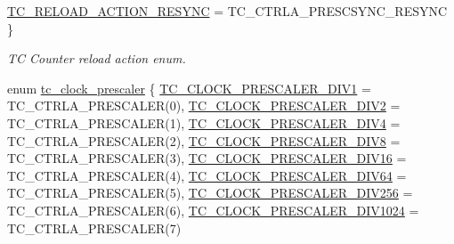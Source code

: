 \begin{DoxyCompactItemize}
\mbox{\hyperlink{group__asfdoc__sam0__tc__group_gga204bb4814c91e62e56d9297c05280aadac78b7c50f80b33d5ef15a63348279f17}{T\+C\+\_\+\+R\+E\+L\+O\+A\+D\+\_\+\+A\+C\+T\+I\+O\+N\+\_\+\+R\+E\+S\+Y\+NC}} = T\+C\+\_\+\+C\+T\+R\+L\+A\+\_\+\+P\+R\+E\+S\+C\+S\+Y\+N\+C\+\_\+\+R\+E\+S\+Y\+NC
 \}
\begin{DoxyCompactList}\small\item\em TC Counter reload action enum. \end{DoxyCompactList}\item 
enum \mbox{\hyperlink{group__asfdoc__sam0__tc__group_ga98aed17b995157e67b9322a45f0ed5f4}{tc\+\_\+clock\+\_\+prescaler}} \{ \newline
\mbox{\hyperlink{group__asfdoc__sam0__tc__group_gga98aed17b995157e67b9322a45f0ed5f4abee76ee986e815120c67ff104dd77275}{T\+C\+\_\+\+C\+L\+O\+C\+K\+\_\+\+P\+R\+E\+S\+C\+A\+L\+E\+R\+\_\+\+D\+I\+V1}} = T\+C\+\_\+\+C\+T\+R\+L\+A\+\_\+\+P\+R\+E\+S\+C\+A\+L\+ER(0), 
\mbox{\hyperlink{group__asfdoc__sam0__tc__group_gga98aed17b995157e67b9322a45f0ed5f4a6326eb4305153ea58ea18ee6a74bc8f0}{T\+C\+\_\+\+C\+L\+O\+C\+K\+\_\+\+P\+R\+E\+S\+C\+A\+L\+E\+R\+\_\+\+D\+I\+V2}} = T\+C\+\_\+\+C\+T\+R\+L\+A\+\_\+\+P\+R\+E\+S\+C\+A\+L\+ER(1), 
\mbox{\hyperlink{group__asfdoc__sam0__tc__group_gga98aed17b995157e67b9322a45f0ed5f4a8c137a94b34809e544d50680c808da23}{T\+C\+\_\+\+C\+L\+O\+C\+K\+\_\+\+P\+R\+E\+S\+C\+A\+L\+E\+R\+\_\+\+D\+I\+V4}} = T\+C\+\_\+\+C\+T\+R\+L\+A\+\_\+\+P\+R\+E\+S\+C\+A\+L\+ER(2), 
\mbox{\hyperlink{group__asfdoc__sam0__tc__group_gga98aed17b995157e67b9322a45f0ed5f4a3dbb4f263ba1e940954ffe8a667bf7d1}{T\+C\+\_\+\+C\+L\+O\+C\+K\+\_\+\+P\+R\+E\+S\+C\+A\+L\+E\+R\+\_\+\+D\+I\+V8}} = T\+C\+\_\+\+C\+T\+R\+L\+A\+\_\+\+P\+R\+E\+S\+C\+A\+L\+ER(3), 
\newline
\mbox{\hyperlink{group__asfdoc__sam0__tc__group_gga98aed17b995157e67b9322a45f0ed5f4aa0bec32bcf9a450d950f9ec9941a6c3a}{T\+C\+\_\+\+C\+L\+O\+C\+K\+\_\+\+P\+R\+E\+S\+C\+A\+L\+E\+R\+\_\+\+D\+I\+V16}} = T\+C\+\_\+\+C\+T\+R\+L\+A\+\_\+\+P\+R\+E\+S\+C\+A\+L\+ER(4), 
\mbox{\hyperlink{group__asfdoc__sam0__tc__group_gga98aed17b995157e67b9322a45f0ed5f4aea8fd1d9e795ec153e80cddc15ad501b}{T\+C\+\_\+\+C\+L\+O\+C\+K\+\_\+\+P\+R\+E\+S\+C\+A\+L\+E\+R\+\_\+\+D\+I\+V64}} = T\+C\+\_\+\+C\+T\+R\+L\+A\+\_\+\+P\+R\+E\+S\+C\+A\+L\+ER(5), 
\mbox{\hyperlink{group__asfdoc__sam0__tc__group_gga98aed17b995157e67b9322a45f0ed5f4a72552d0e6095d90da22981b7bd7a33ed}{T\+C\+\_\+\+C\+L\+O\+C\+K\+\_\+\+P\+R\+E\+S\+C\+A\+L\+E\+R\+\_\+\+D\+I\+V256}} = T\+C\+\_\+\+C\+T\+R\+L\+A\+\_\+\+P\+R\+E\+S\+C\+A\+L\+ER(6), 
\mbox{\hyperlink{group__asfdoc__sam0__tc__group_gga98aed17b995157e67b9322a45f0ed5f4af1540c54586b7cd0c5e46c60162951ec}{T\+C\+\_\+\+C\+L\+O\+C\+K\+\_\+\+P\+R\+E\+S\+C\+A\+L\+E\+R\+\_\+\+D\+I\+V1024}} = T\+C\+\_\+\+C\+T\+R\+L\+A\+\_\+\+P\+R\+E\+S\+C\+A\+L\+ER(7)

\end{DoxyCompactItemize}
